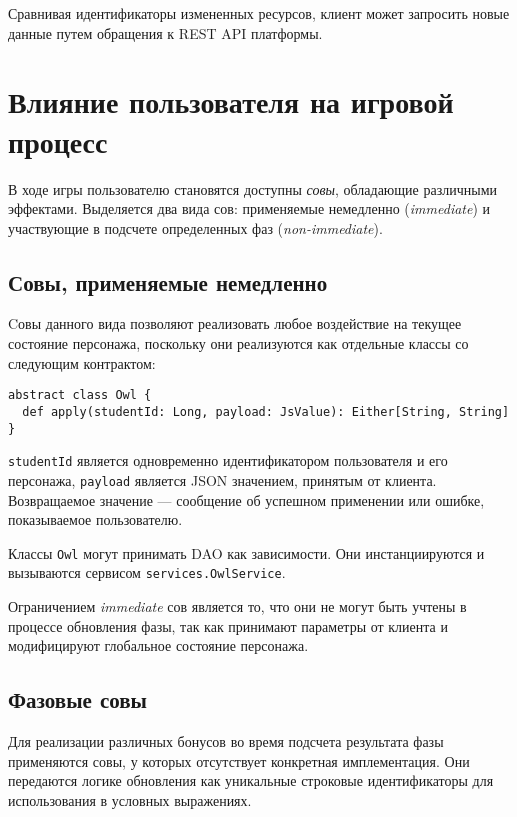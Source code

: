 \documentclass[12pt, a4paper]{article}
\begin{document}
Сравнивая идентификаторы измененных ресурсов, клиент может запросить новые данные
путем обращения к REST API платформы.

\section*{Влияние пользователя на игровой процесс}

В ходе игры пользователю становятся доступны \textit{совы}, обладающие различными эффектами.
Выделяется два вида сов: применяемые немедленно (\textit{immediate}) и участвующие в подсчете
определенных фаз (\textit{non-immediate}).

\subsection*{Совы, применяемые немедленно}

Cовы данного вида позволяют реализовать любое воздействие на текущее состояние
персонажа, поскольку они реализуются как отдельные классы со следующим контрактом:

\begin{verbatim}
abstract class Owl {
  def apply(studentId: Long, payload: JsValue): Either[String, String]
}
\end{verbatim}

\texttt{studentId} является одновременно идентификатором пользователя и его персонажа,
\texttt{payload} является JSON значением, принятым от клиента. Возвращаемое значение —
сообщение об успешном применении или ошибке, показываемое пользователю.

Классы \texttt{Owl} могут принимать DAO как зависимости. Они инстанциируются и вызываются
сервисом \texttt{services.OwlService}.

Ограничением \textit{immediate} сов является то, что они не могут быть учтены в процессе
обновления фазы, так как принимают параметры от клиента и модифицируют глобальное состояние
персонажа.

\subsection*{Фазовые совы}

Для реализации различных бонусов во время подсчета результата фазы применяются совы, у которых
отсутствует конкретная имплементация. Они передаются логике обновления как уникальные строковые идентификаторы
для использования в условных выражениях.
\end{document}
